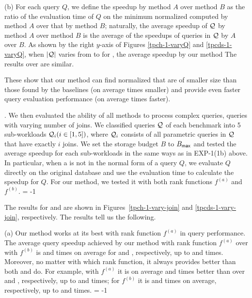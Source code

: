 \sstab (b) For each query $Q$, we define the speedup by method
$A$ over method $B$ as the ratio of the evaluation time of $Q$
on the minimum normalized \bds computed by method $A$ over that
by method $B$; naturally, the average speedup of $\mathcal Q$ by method
$A$ over method $B$ is the average of the speedups of queries in
$\mathcal Q$ by $A$ over $B$.
As shown by the right $y$-axis of Figures \ref{tpch-1-varyQ} and \ref{tpcds-1-varyQ},
when $|\mathcal Q|$ varies from  to  for
\tpcds, the average speedup by our method
The results over \tpch are similar.

\vspace{1ex}
These show that our method can find normalized \bdss that are of
smaller size than those found by the baselines (\eg on average 
times smaller) and %
provide even faster query evaluation
performance (\eg on average  times faster).






.
We then evaluated the ability of all methods to process complex
queries, \ie queries with varying number of %
joins. We
classified queries $\mathcal Q$ of each benchmark into 5 sub-workloads
$\mathcal Q_{i}\allowbreak (i\allowbreak\in\allowbreak [1,\allowbreak 5])$, 
where $\mathcal Q_{i}$ consists of all parametric queries in $\mathcal Q$ that have exactly $i$
joins. We set the storage budget $B$ to $B_{\protect\mathsf{max}}$ and tested the average
speedup for each sub-workloads in the same ways as in EXP-1(1b)
above. In particular, when a \bds is not in the normal form of a
query $Q$, we evaluate $Q$ directly on the original database and
use the evaluation time to calculate the speedup for $Q$.
For our method, we tested it with both rank functions $f^{(a)}$
and $f^{(b)}$.
\looseness = -1

\vspace{0.6ex}
The results for \tpch and \tpcds are shown in
Figures~\ref{tpch-1-vary-join} and \ref{tpcds-1-vary-join},
respectively. The results tell us the following. 

\sstab (a) Our method works at its best with rank
function $f^{(a)}$ in %
query performance.
The average query speedup achieved by our method
with rank function $f^{(a)}$ over %
with
$f^{(b)}$ is  and  times on average for \tpch and \tpcds,
respectively, up to  and  times.
Moreover, no matter with which rank function, it always
provides \bdss better than both \qcssel and \uscsel do.
For example, with $f^{(a)}$ it is on average  and 
times better than \qcssel over \tpch and \tpcds, respectively,
up to  and  times; for $f^{(b)}$ it is  and
 times on average, respectively, up to  and  times.
\looseness = -1

